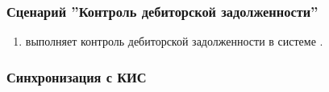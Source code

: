 \subsubsection{Сценарий ''Контроль дебиторской задолженности''}
\label{bp:sales_6}


\begin{enumerate}
\item	\manager выполняет контроль дебиторской задолженности в системе \unf.
\end{enumerate}

\subsubsection{Синхронизация с КИС}
\label{bp:sales_integration}


